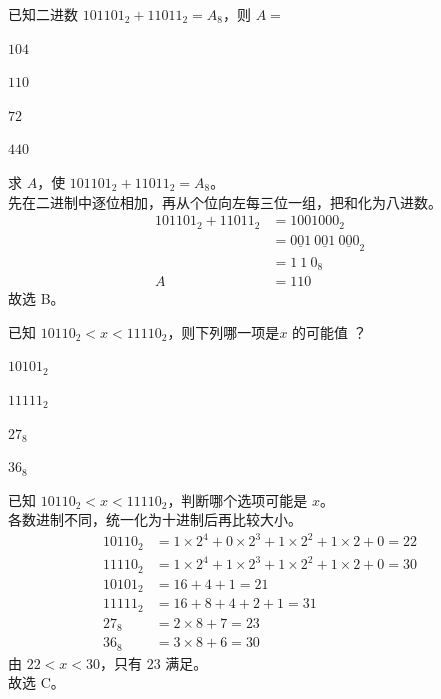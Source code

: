 \documentclass[12pt,a4paper,fontset=none]{exam-zh}
\begin{document}
\makeexamheader

\begin{question}
    已知二进数 $101101_2+11011_2=A_8$，则 $A=$ \paren[B]
    \begin{choices}
        \item $104$
        \item $110$
        \item $72$
        \item $440$
    \end{choices}
\end{question}

\begin{solution}
    求 $A$，使 $101101_2+11011_2=A_8$。 \\
    先在二进制中逐位相加，再从个位向左每三位一组，把和化为八进数。
    \begin{align*}
        101101_2+11011_2 &= 1001000_2 \\
        &= {\underline{001}\ \underline{001}\ \underline{000}}_2 \\
        &= {1\ 1\ 0}_8 \\
        A &= 110
    \end{align*}
    故选 B。
\end{solution}

\begin{question}
    已知 $10110_2<x<11110_2$，则下列哪一项是$x$ 的可能值 \paren[C]？
    \begin{choices}
        \item $10101_2$
        \item $11111_2$
        \item $27_8$
        \item $36_8$
    \end{choices}
\end{question}

\begin{solution}
    已知 $10110_2<x<11110_2$，判断哪个选项可能是 $x$。 \\
    各数进制不同，统一化为十进制后再比较大小。
    \begin{align*}
        10110_2 &= 1\times2^4+0\times2^3+1\times2^2+1\times2+0 = 22 \\
        11110_2 &= 1\times2^4+1\times2^3+1\times2^2+1\times2+0 = 30 \\
        10101_2 &= 16+4+1 = 21 \\
        11111_2 &= 16+8+4+2+1 = 31 \\
        27_8 &= 2\times8+7 = 23 \\
        36_8 &= 3\times8+6 = 30
    \end{align*}
    由 $22<x<30$，只有 $23$ 满足。\\
    故选 C。
\end{solution}
\end{document}
